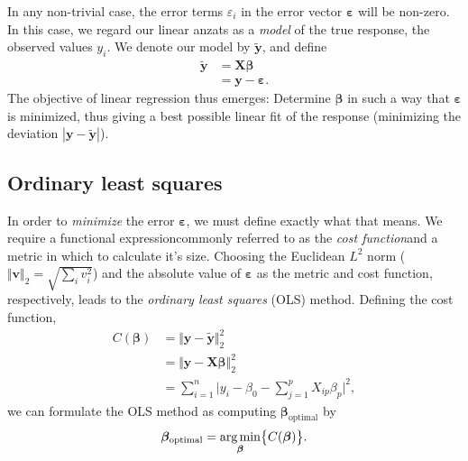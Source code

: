 \documentclass[a4paper, twocolumn]{article}
\begin{document}
In any non-trivial case, the error terms $\varepsilon_i$ in the error vector $\bm\varepsilon$ will be non-zero. In this case, we regard our linear anzats as a \textit{model} of the true response, the observed values $y_i$. We denote our model by $\tilde{\mathbf{y}}$, and define 
\begin{align}
\tilde{\mathbf{y}} &= \mathbf{X}\bm{\beta} \\
&= \mathbf{y}-\bm{\varepsilon}. \nonumber
\end{align}
The objective of linear regression thus emerges: Determine $\bm\beta$ in such a way that $\bm\varepsilon$ is minimized, thus giving a best possible linear fit of the response (minimizing the deviation $|\mathbf{y}-\tilde{\mathbf{y}}|$).

\subsection{Ordinary least squares \label{sect:OLS}}
In order to \textit{minimize} the error $\bm\varepsilon$, we must define exactly what that means. We require a functional expression\textemdash commonly referred to as the \textit{cost function}\textemdash and a metric in which to calculate it's size. Choosing the Euclidean $L^2$ norm ($\Vert \mathbf{v} \Vert_2=\sqrt{\sum_i v_i^2}$) and the absolute value of $\bm\varepsilon$ as the metric and cost function, respectively, leads to the \textit{ordinary least squares} (OLS) method. Defining the cost function, 
\begin{align}
C(\bm\beta) &= \Vert \mathbf{y} - \tilde{\mathbf{y}}\Vert_2^2 \nonumber \\
%
&= \Vert \mathbf{y} - \mathbf{X}\bm\beta\Vert_2^2 \nonumber \\ 
&= \sum_{i=1}^n \Big| y_i - \beta_0 - \sum_{j=1}^p X_{ip} \beta_p \Big|^2, \label{eq:cost}
\end{align}
we can formulate the OLS method as computing $\bm\beta_\text{optimal}$ by
\begin{align}
\bm\beta_\text{optimal}=\underset{\bm\beta}{\text{arg\,min}}\big\{C(\bm\beta)\big\}.
\end{align}
\end{document}
